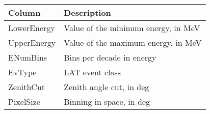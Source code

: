 \begin{tabular}{ll} 
\hline
\hline
  \multicolumn{1}{l}{Column}&
  \multicolumn{1}{l}{Description}\\
\hline
  LowerEnergy &  Value of the minimum energy, in MeV\\
  UpperEnergy &  Value of the maximum energy, in MeV\\
  ENumBins & Bins per decade in energy\\
  EvType &  LAT event class\\
  ZenithCut &  Zenith angle cut, in deg\\
  PixelSize &  Binning in space, in deg\\
\hline
\end{tabular}